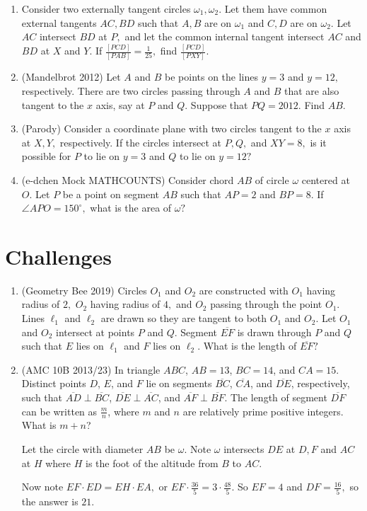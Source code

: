 \begin{enumerate}
\item Consider two externally tangent circles $\omega_1,\omega_2.$ Let them have common external tangents $AC,BD$ such that $A,B$ are on $\omega_1$ and $C,D$ are on $\omega_2.$ Let $AC$ intersect $BD$ at $P,$ and let the common internal tangent intersect $AC$ and $BD$ at $X$ and $Y$. If $\frac{[PCD]}{[PAB]}=\frac{1}{25},$ find $\frac{[PCD]}{[PXY]}.$

\item (Mandelbrot 2012) Let $A$ and $B$ be points on the lines $y=3$ and $y=12,$ respectively. There are two circles passing through $A$ and $B$ that are also tangent to the $x$ axis, say at $P$ and $Q.$ Suppose that $PQ=2012.$ Find $AB.$

\item (Parody) Consider a coordinate plane with two circles tangent to the $x$ axis at $X,Y,$ respectively. If the circles intersect at $P,Q,$ and $XY=8,$ is it possible for $P$ to lie on $y=3$ and $Q$ to lie on $y=12?$

\item (e-dchen Mock MATHCOUNTS) Consider chord $AB$ of circle $\omega$ centered at $O.$ Let $P$ be a point on segment $AB$ such that $AP=2$ and $BP=8$. If $\angle APO=150^{\circ},$ what is the area of $\omega?$
\end{enumerate}

\section{Challenges}

\begin{enumerate}
	\item (Geometry Bee 2019) Circles $O_1$ and $O_2$ are constructed with $O_1$ having radius of $2,$ $O_2$ having radius of $4,$ and $O_2$ passing through the point $O_1.$ Lines $\ell_1$ and $\ell_2$ are drawn so they are tangent to both $O_1$ and $O_2.$ Let $O_1$ and $O_2$ intersect at points $P$ and $Q.$ Segment $\overline{EF}$ is drawn through $P$ and $Q$ such that $E$ lies on $\ell_1$ and $F$ lies on $\ell_2.$ What is the length of $\overline{EF}?$
	
\item (AMC 10B 2013/23) In triangle $ABC$, $AB=13$, $BC=14$, and $CA=15$. Distinct points $D$, $E$, and $F$ lie on segments $\overline{BC}$, $\overline{CA}$, and $\overline{DE}$, respectively, such that $\overline{AD}\perp\overline{BC}$, $\overline{DE}\perp\overline{AC}$, and $\overline{AF}\perp\overline{BF}$. The length of segment $\overline{DF}$ can be written as $\frac{m}{n}$, where $m$ and $n$ are relatively prime positive integers. What is $m+n$?
\begin{solu}
\begin{addsol}
{Let the circle with diameter $AB$ be $\omega.$ Note $\omega$ intersects $DE$ at $D,F$ and $AC$ at $H$ where $H$ is the foot of the altitude from $B$ to $AC.$

Now note $EF\cdot ED=EH\cdot EA,$ or $EF\cdot \frac{36}{5}=3\cdot \frac{48}{5}.$ So $EF=4$ and $DF=\frac{16}{5},$ so the answer is $21.$}
\end{addsol}
\end{solu}
\end{enumerate}